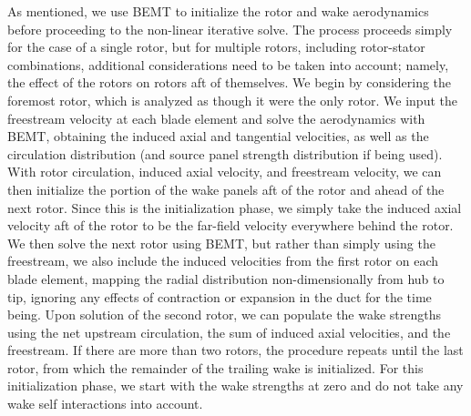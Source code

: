 As mentioned, we use BEMT to initialize the rotor and wake aerodynamics before proceeding to the non-linear iterative solve.
%
The process proceeds simply for the case of a single rotor, but for multiple rotors, including rotor-stator combinations, additional considerations need to be taken into account; namely, the effect of the rotors on rotors aft of themselves.
%
We begin by considering the foremost rotor, which is analyzed as though it were the only rotor.
%
We input the freestream velocity at each blade element and solve the aerodynamics with BEMT, obtaining the induced axial and tangential velocities, as well as the circulation distribution (and source panel strength distribution if being used).
%
With rotor circulation, induced axial velocity, and freestream velocity, we can then initialize the portion of the wake panels aft of the rotor and ahead of the next rotor.
%
Since this is the initialization phase, we simply take the induced axial velocity aft of the rotor to be the far-field velocity everywhere behind the rotor.
%
We then solve the next rotor using BEMT, but rather than simply using the freestream, we also include the induced velocities from the first rotor on each blade element, mapping the radial distribution non-dimensionally from hub to tip, ignoring any effects of contraction or expansion in the duct for the time being.
%
Upon solution of the second rotor, we can populate the wake strengths using the net upstream circulation, the sum of induced axial velocities, and the freestream.
%
If there are more than two rotors, the procedure repeats until the last rotor, from which the remainder of the trailing wake is initialized.
%
For this initialization phase, we start with the wake strengths at zero and do not take any wake self interactions into account.
